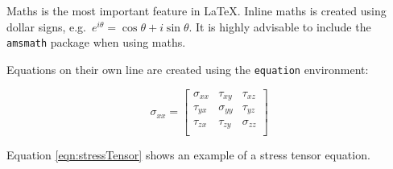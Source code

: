 \documentclass[a4paper,12pt]{article}
\begin{document}
Maths is the most important feature in \LaTeX. Inline maths is created using dollar signs, e.g.\ $e^{i\theta}=\cos\theta + i\sin\theta$. It is highly advisable to include the \texttt{amsmath} package when using maths.

Equations on their own line are created using the \texttt{equation} environment:

\begin{equation}
  \sigma_{xx} =
  \begin{bmatrix}
    \sigma_{xx} & \tau_{xy}   & \tau_{xz}   \\
    \tau_{yx}   & \sigma_{yy} & \tau_{yz}   \\
    \tau_{zx}   & \tau_{zy}   & \sigma_{zz} \\
  \end{bmatrix}
  \label{eqn:stressTensor}
\end{equation}

Equation \ref{eqn:stressTensor} shows an example of a stress tensor equation.
\end{document}
